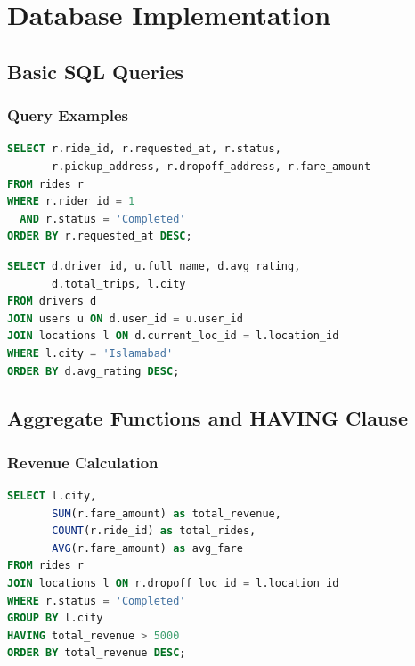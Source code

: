 \documentclass[12pt,a4paper]{report}
\begin{document}
\chapter{Database Implementation}

\section{Basic SQL Queries}

\subsection{Query Examples}

\begin{lstlisting}[language=SQL, caption={List all completed rides for a specific rider}]
SELECT r.ride_id, r.requested_at, r.status, 
       r.pickup_address, r.dropoff_address, r.fare_amount
FROM rides r
WHERE r.rider_id = 1 
  AND r.status = 'Completed'
ORDER BY r.requested_at DESC;
\end{lstlisting}

\begin{lstlisting}[language=SQL, caption={List all drivers in a city ordered by rating}]
SELECT d.driver_id, u.full_name, d.avg_rating, 
       d.total_trips, l.city
FROM drivers d
JOIN users u ON d.user_id = u.user_id
JOIN locations l ON d.current_loc_id = l.location_id
WHERE l.city = 'Islamabad'
ORDER BY d.avg_rating DESC;
\end{lstlisting}

\section{Aggregate Functions and HAVING Clause}

\subsection{Revenue Calculation}

\begin{lstlisting}[language=SQL, caption={Calculate total revenue per city}]
SELECT l.city, 
       SUM(r.fare_amount) as total_revenue,
       COUNT(r.ride_id) as total_rides,
       AVG(r.fare_amount) as avg_fare
FROM rides r
JOIN locations l ON r.dropoff_loc_id = l.location_id
WHERE r.status = 'Completed'
GROUP BY l.city
HAVING total_revenue > 5000
ORDER BY total_revenue DESC;
\end{lstlisting}
\end{document}
